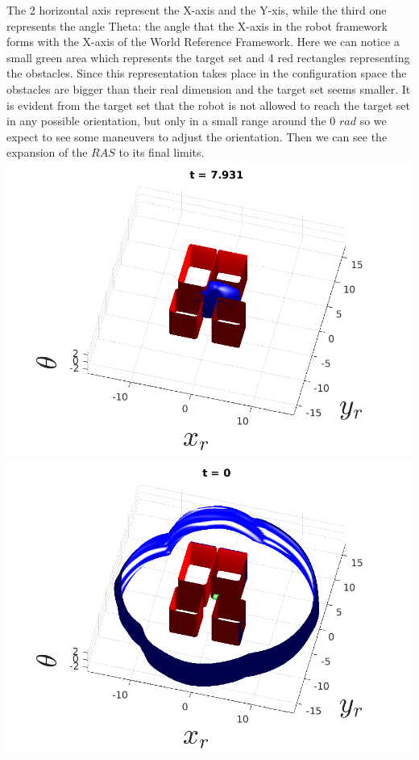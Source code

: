     The 2 horizontal axis represent the X-axis and the Y-xis, while the third one represents the angle Theta: the angle that the X-axis in the robot framework forms with the X-axis of the World Reference Framework.  
    Here we can notice a small green area which represents the target set and 4 red
    rectangles representing the obstacles. Since this representation takes place in the configuration space the obstacles are bigger than their real dimension and the target set seems smaller.
    It is evident from the target set that the robot is not allowed to reach the target set in any possible orientation, but only in a small range around the 0 $rad$ so we expect to see some maneuvers to adjust the orientation.  
    Then we can see the expansion of the $RAS$ to its final limits.
    \includegraphics[scale=0.6]{figures/staticRAS2.png}
    \includegraphics[scale=0.6]{figures/staticRAS3.png}
